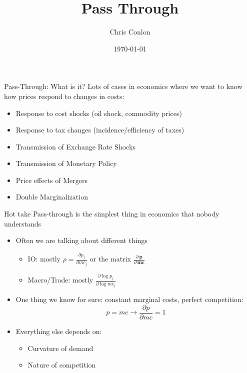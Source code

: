 

\usepackage{tabularx}
\usepackage{dcolumn}
\usepackage{ragged2e}
\usepackage{multirow,multicol,dcolumn}





\title{Pass Through}
\author{Chris Conlon}
\date{\today}

\frame{\titlepage}


\begin{frame}{Pass-Through: What is it?}
Lots of cases in economics where we want to know how prices respond to changes in costs:

\begin{itemize}
    \item Response to cost shocks (oil shock, commodity prices)
    \item Response to tax changes (incidence/efficiency of taxes)
    \item Transmission of Exchange Rate Shocks
    \item Transmission of Monetary Policy
    \item Price effects of Mergers
    \item Double Marginalization
\end{itemize}
\end{frame}


\begin{frame}{Hot take}
Pass-through is the simplest thing in economics that nobody understands
\begin{itemize}
\item Often we are talking about different things
\begin{itemize}
\item IO: mostly $\rho = \frac{\partial p_j}{\partial mc_j}$ or the matrix $\frac{\partial\, \mathbf{p}}{\partial\, \mathbf{mc}}$
\item Macro/Trade: mostly $\frac{\partial \log p_j}{\partial \log mc_j}$
\end{itemize}
\item One thing we know for sure: constant marginal costs, perfect competition: \\
 $$p = mc \rightarrow \frac{\partial p}{\partial mc} = 1$$
 \item Everything else depends on:
\begin{itemize}
\item Curvature of demand
\item Nature of competition
\end{itemize}
\end{itemize}
\end{frame}

